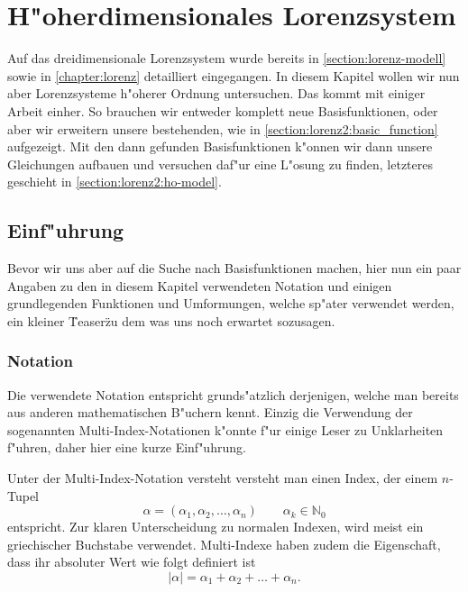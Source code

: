 %
%
%
\chapter{H"oherdimensionales Lorenzsystem\label{chapter:lorenz2}}
\begin{refsection}

Auf das dreidimensionale Lorenzsystem wurde bereits in 
\cref{section:lorenz-modell} sowie in \cref{chapter:lorenz} detailliert 
eingegangen. In diesem Kapitel wollen wir nun aber Lorenzsysteme h"oherer 
Ordnung untersuchen. Das kommt mit einiger Arbeit einher. So brauchen wir 
entweder komplett neue Basisfunktionen, oder aber wir erweitern unsere 
bestehenden, wie in \cref{section:lorenz2:basic_function} aufgezeigt. Mit den 
dann gefunden Basisfunktionen k"onnen wir dann unsere Gleichungen aufbauen und 
versuchen daf"ur eine L"osung zu finden, letzteres geschieht in 
\cref{section:lorenz2:ho-model}.

\section{Einf"uhrung}

Bevor wir uns aber auf die Suche nach Basisfunktionen machen, hier nun ein paar 
Angaben zu den in diesem Kapitel verwendeten Notation und einigen grundlegenden 
Funktionen und Umformungen, welche sp"ater verwendet werden, ein kleiner 
\"Teaser\" zu dem was uns noch erwartet sozusagen.

\subsection{Notation}
Die verwendete Notation entspricht grunds"atzlich derjenigen, welche man 
bereits aus anderen mathematischen B"uchern kennt. Einzig die Verwendung der 
sogenannten Multi-Index-Notationen k"onnte f"ur einige Leser zu Unklarheiten 
f"uhren, daher hier eine kurze Einf"uhrung.

Unter der Multi-Index-Notation versteht versteht man einen Index, der einem 
$n$-Tupel
\begin{equation*}
	\alpha = (\alpha_1, \alpha_2, \dotsc, \alpha_n) \qquad \alpha_k \in 
	\mathbb{N}_{0}
\end{equation*}
entspricht. Zur klaren Unterscheidung zu normalen Indexen, wird meist ein 
griechischer Buchstabe verwendet. Multi-Indexe haben zudem die Eigenschaft, 
dass ihr absoluter Wert wie folgt definiert ist
\begin{equation*}
	|\alpha| = \alpha_1 + \alpha_2 + \dots + \alpha_n.
\end{equation*}
 

\end{refsection}
